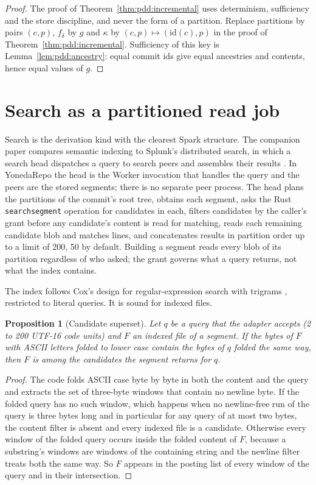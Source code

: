 \documentclass[11pt,letterpaper]{article}
\newtheorem{proposition}[theorem]{Proposition}
\theoremstyle{definition}
\theoremstyle{remark}
\newcommand{\id}{\mathrm{id}}
\DeclareRobustCommand{\code}[1]{{\def\_{\textunderscore\allowbreak}\texttt{#1}}}
\begin{document}
\begin{proof}
The proof of Theorem~\ref{thm:pdd:incremental} uses determinism, sufficiency and the store discipline, and never the form of a partition. Replace partitions by pairs $(c,p)$, $f_\delta$ by $g$ and $\kappa$ by $(c,p)\mapsto(\id(c),p)$ in the proof of Theorem~\ref{thm:pdd:incremental}. Sufficiency of this key is Lemma~\ref{lem:pdd:ancestry}: equal commit ids give equal ancestries and contents, hence equal values of $g$.
\end{proof}

\section{Search as a partitioned read job}
\label{sec:pdd:search}

Search is the derivation kind with the clearest Spark structure. The companion paper compares semantic indexing to Splunk's distributed search, in which a search head dispatches a query to search peers and assembles their results \cite{long2026inversion}. In YonedaRepo the head is the Worker invocation that handles the query and the peers are the stored segments; there is no separate peer process. The head plans the partitions of the commit's root tree, obtains each segment, asks the Rust \code{search\_segment} operation for candidates in each, filters candidates by the caller's grant before any candidate's content is read for matching, reads each remaining candidate blob and matches lines, and concatenates results in partition order up to a limit of 200, 50 by default. Building a segment reads every blob of its partition regardless of who asked; the grant governs what a query returns, not what the index contains.

The index follows Cox's design for regular-expression search with trigrams \cite{cox2012trigram}, restricted to literal queries. It is sound for indexed files.

\begin{proposition}[Candidate superset]
\label{prop:pdd:superset}
Let $q$ be a query that the adapter accepts (2 to 200 UTF-16 code units) and $F$ an indexed file of a segment. If the bytes of $F$ with ASCII letters folded to lower case contain the bytes of $q$ folded the same way, then $F$ is among the candidates the segment returns for $q$.
\end{proposition}

\begin{proof}
The code folds ASCII case byte by byte in both the content and the query and extracts the set of three-byte windows that contain no newline byte. If the folded query has no such window, which happens when no newline-free run of the query is three bytes long and in particular for any query of at most two bytes, the content filter is absent and every indexed file is a candidate. Otherwise every window of the folded query occurs inside the folded content of $F$, because a substring's windows are windows of the containing string and the newline filter treats both the same way. So $F$ appears in the posting list of every window of the query and in their intersection.
\end{proof}
\end{document}
